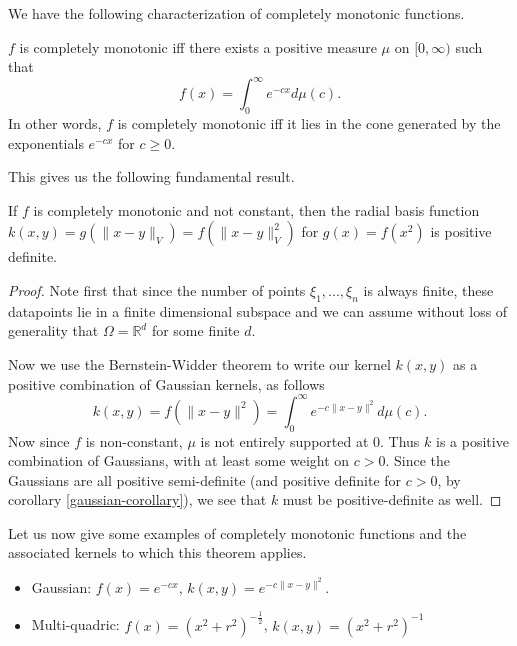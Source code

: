 We have the following characterization of completely monotonic functions.
\begin{theorem}
 $f$ is completely monotonic iff there exists a positive measure $\mu$ on $[0,\infty)$ such that
 \begin{equation}
  f(x) = \int_0^\infty e^{-cx} d\mu(c).
 \end{equation}
 In other words, $f$ is completely monotonic iff it lies in the cone generated by the exponentials $e^{-cx}$ for $c \geq 0$.
\end{theorem}

This gives us the following fundamental result.

\begin{theorem}
 If $f$ is completely monotonic and not constant, then the radial basis function $k(x,y) = g(\|x-y\|_V) = f(\|x-y\|_V^2)$ for $g(x) = f(x^2)$ is positive definite.
\end{theorem}
\begin{proof}
 Note first that since the number of points $\xi_1,...,\xi_n$ is always finite, these datapoints lie in a finite dimensional subspace and we can assume without loss of generality that $\Omega = \mathbb{R}^d$ for some finite $d$.
 
 Now we use the Bernstein-Widder theorem to write our kernel $k(x,y)$ as a positive combination of Gaussian kernels, as follows
 \begin{equation}
  k(x,y) = f(\|x-y\|^2) = \int_0^\infty e^{-c\|x-y\|^2} d\mu(c).
 \end{equation}
 Now since $f$ is non-constant, $\mu$ is not entirely supported at $0$. Thus $k$ is a positive combination of Gaussians, with at least some weight on $c > 0$. Since the Gaussians are all positive semi-definite (and positive definite for $c > 0$, by corollary \ref{gaussian-corollary}), we see that $k$ must be positive-definite as well.

\end{proof}

Let us now give some examples of completely monotonic functions and the associated kernels to which this theorem applies.
\begin{itemize}
 \item Gaussian: $f(x) = e^{-cx}$, $k(x,y) = e^{-c\|x-y\|^2}$.
 \item Multi-quadric: $f(x) = (x^2 + r^2)^{-\frac{1}{2}}$, $k(x,y) = (x^2 + r^2)^{-1}$
\end{itemize}

